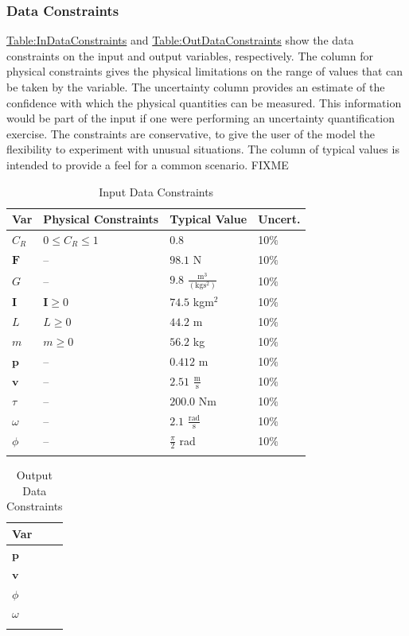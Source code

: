 \documentclass[12pt]{article}
\begin{document}
\subsubsection{Data Constraints}
\label{Sec:DataConstraints}
\hyperref[Table:InDataConstraints]{Table:InDataConstraints} and \hyperref[Table:OutDataConstraints]{Table:OutDataConstraints} show the data constraints on the input and output variables, respectively. The column for physical constraints gives the physical limitations on the range of values that can be taken by the variable. The uncertainty column provides an estimate of the confidence with which the physical quantities can be measured. This information would be part of the input if one were performing an uncertainty quantification exercise. The constraints are conservative, to give the user of the model the flexibility to experiment with unusual situations. The column of typical values is intended to provide a feel for a common scenario. FIXME
\begin{longtable}{l l l l}
\toprule
Var & Physical Constraints & Typical Value & Uncert.
\\
\midrule
\endhead
${C_{R}}$ & $0\leq{}{C_{R}}\leq{}1$ & $0.8$ & 10$\%$
\\
$\mathbf{F}$ & -- & $98.1$ N & 10$\%$
\\
$G$ & -- & $9.8$ $\frac{\text{m}^{3}}{(\text{kg}\text{s}^{2})}$ & 10$\%$
\\
$\mathbf{I}$ & $\mathbf{I}\geq{}0$ & $74.5$ kg$\text{m}^{2}$ & 10$\%$
\\
$L$ & $L\geq{}0$ & $44.2$ m & 10$\%$
\\
$m$ & $m\geq{}0$ & $56.2$ kg & 10$\%$
\\
$\mathbf{p}$ & -- & $0.412$ m & 10$\%$
\\
$\mathbf{v}$ & -- & $2.51$ $\frac{\text{m}}{\text{s}}$ & 10$\%$
\\
$τ$ & -- & $200.0$ Nm & 10$\%$
\\
$ω$ & -- & $2.1$ $\frac{\text{rad}}{\text{s}}$ & 10$\%$
\\
$ϕ$ & -- & $\frac{π}{2}$ rad & 10$\%$
\\
\bottomrule
\caption{Input Data Constraints}
\label{Table:InDataConstraints}
\end{longtable}
\begin{longtable}{l}
\toprule
Var
\\
\midrule
\endhead
$\mathbf{p}$
\\
$\mathbf{v}$
\\
$ϕ$
\\
$ω$
\\
\bottomrule
\caption{Output Data Constraints}
\label{Table:OutDataConstraints}
\end{longtable}
\end{document}
